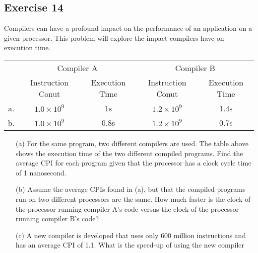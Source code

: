 \documentclass[12pt]{article}
\begin{document}
\subsection*{Exercise 14}
Compilers can have a profound impact on the performance of an application on a given processor. This problem will explore the impact compilers have on execution time.
\begin{center}
\begin{tabular}{| c | c | c | c | c |}
\hline
\multirow{2}{*}{} & \multicolumn{2}{|c|}{Compiler A} & \multicolumn{2}{|c|}{Compiler B} \\
\cline{2-5}
& Instruction Conut & Execution Time & Instruction Conut & Execution Time \\
\hline
a. & $1.0\times10^9$ & 1s & $1.2\times10^9$ & 1.4s \\
\hline
b. & $1.0\times10^9$ & 0.8s & $1.2\times10^9$ & 0.7s \\
\hline
\end{tabular}
\end{center}
\begin{itemize}
\item[(a)] For the same program, two different compilers are used. The table above shows the execution time of the two different compiled programs. Find the average CPI for each program given that the processor has a clock cycle time of 1 nanosecond.
\item[(b)] Assume the average CPIs found in (a), but that the compiled programs run on two different processors are the same. How much faster is the clock of the processor running compiler A's code versus the clock of the processor running compiler B's code?
\item[(c)] A new compiler is developed that uses only 600 million instructions and has an average CPI of 1.1. What is the speed-up of using the new compiler 
\end{itemize}
\end{document}
